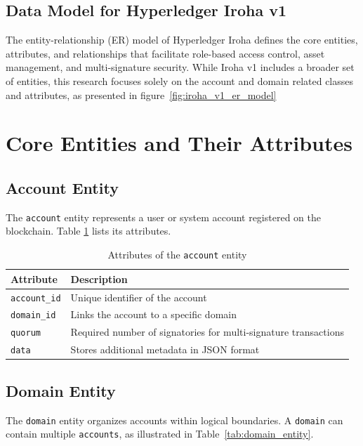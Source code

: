 \documentclass{article}
\begin{document}
\subsection{ Data Model for Hyperledger Iroha v1}

The entity-relationship (ER) model of Hyperledger Iroha defines the core entities, attributes, and relationships that facilitate role-based access control, asset management, and multi-signature security. While Iroha v1 includes a broader set of entities, this research focuses solely on the account and domain related classes and attributes, as presented in figure~\ref{fig:iroha_v1_er_model}

\section{Core Entities and Their Attributes}
\subsection{Account Entity}
The \texttt{account} entity represents a user or system account registered on the blockchain. Table \ref{tab:account_entity} lists its attributes.

\begin{table}[h]
      \centering
      \renewcommand{\arraystretch}{1.2}
      \caption{Attributes of the \texttt{account} entity}
      \label{tab:account_entity}
      \begin{tabularx}{\textwidth}{|l|X|}
            \hline
            \textbf{Attribute}   & \textbf{Description}                                            \\ \hline
            \texttt{account\_id} & Unique identifier of the account                                \\ \hline
            \texttt{domain\_id}  & Links the account to a specific domain                          \\ \hline
            \texttt{quorum}      & Required number of signatories for multi-signature transactions \\ \hline
            \texttt{data}        & Stores additional metadata in JSON format                       \\ \hline
      \end{tabularx}
\end{table}


\subsection{Domain Entity}
The \texttt{domain} entity organizes accounts within logical boundaries. A \texttt{domain} can contain multiple \texttt{accounts}, as illustrated in Table~\ref{tab:domain_entity}.
\end{document}
